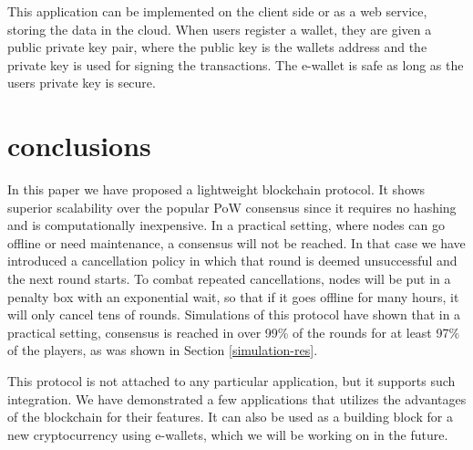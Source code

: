 \documentclass[10pt]{article}
\begin{document}
This application can be implemented on the client side or as a web service, storing the data in the cloud. When users register a wallet, they are given a public private key pair, where the public key is the wallets address and the private key is used for signing the transactions. The e-wallet is safe as long as the users private key is secure. 





\section{conclusions}
In this paper we have proposed a lightweight blockchain protocol. It shows superior scalability over the popular PoW consensus since it requires no hashing and is computationally inexpensive. In a practical setting, where nodes can go offline or need maintenance, a consensus will not be reached. In that case we have introduced a cancellation policy in which that round is deemed unsuccessful and the next round starts. To combat repeated cancellations, nodes will be put in a penalty box with an exponential wait, so that if it goes offline for many hours, it will only cancel tens of rounds. Simulations of this protocol have shown that in a practical setting, consensus is reached in over 99\% of the rounds for at least 97\% of the players, as was shown in Section \ref{simulation-res}. 

This protocol is not attached to any particular application, but it supports such integration. We have demonstrated a few applications that utilizes the advantages of the blockchain for their features. It can also be used as a building block for a new cryptocurrency using e-wallets, which we will be working on in the future.

\end{document}
